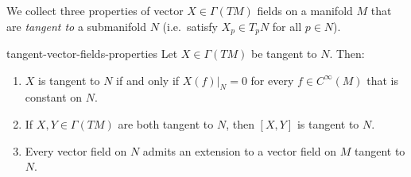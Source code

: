 


















We collect three properties of vector $X\in\Gamma(TM)$ fields on a manifold $M$ that are \emph{tangent to} a submanifold $N$ (i.e.\ satisfy $X_p \in T_p N$ for all $p \in N$).

\begin{colorlem}{}{tangent-vector-fields-properties}
Let $X \in \Gamma(TM)$ be tangent to $N$. Then:
\begin{enumerate}
    \item[(a)] $X$ is tangent to $N$ if and only if $X(f)\big|_N = 0$ for every $f \in C^\infty(M)$ that is constant on $N$.
    \item[(b)] If $X, Y \in \Gamma(TM)$ are both tangent to $N$, then $[X, Y]$ is tangent to $N$.
    \item[(c)] Every vector field on $N$ admits an extension to a vector field on $M$ tangent to $N$.
\end{enumerate}
\end{colorlem}


